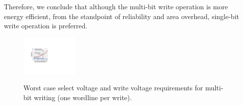 Therefore, we conclude that although the multi-bit write operation is
more energy efficient, from the standpoint of reliability and area overhead, single-bit write operation is preferred.




\begin{figure}%
\centering\label{fig:multiV}
  \includegraphics[width=0.25\textwidth]{./figures/multi_V_one.pdf}\\
  \caption{Worst case select voltage and write voltage requirements for multi-bit writing (one wordline per write).}\label{fig:reliable_region}
    \vspace{-10pt}
\end{figure}

